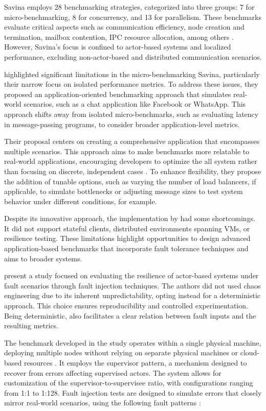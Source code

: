 Savina employs 28 benchmarking strategies, categorized into three groups: 7 for micro-benchmarking, 8 for concurrency, and 13 for parallelism. These benchmarks evaluate critical aspects such as communication efficiency, node creation and termination, mailbox contention, \gls{IPC} resource allocation, among others \cite{Imam2014,Blessing2019}. However, Savina’s focus is confined to actor-based systems and localized performance, excluding non-actor-based and distributed communication scenarios.

\textcite{Blessing2019} highlighted significant limitations in the micro-benchmarking Savina, particularly their narrow focus on isolated performance metrics. To address these issues, they proposed an application-oriented benchmarking approach that simulates real-world scenarios, such as a chat application like Facebook or WhatsApp. This approach shifts away from isolated micro-benchmarks, such as evaluating latency in message-passing programs, to consider broader application-level metrics.

Their proposal centers on creating a comprehensive application that encompasses multiple scenarios. This approach aims to make benchmarks more relatable to real-world applications, encouraging developers to optimize the all system rather than focusing on discrete, independent cases \cite{Blessing2019}. To enhance flexibility, they propose the addition of tunable options, such as varying the number of load balancers, if applicable, to simulate bottlenecks or adjusting message sizes to test system behavior under different conditions, for example.

Despite its innovative approach, the implementation by \textcite{Blessing2019} had some shortcomings. It did not support stateful clients, distributed environments spanning \glspl{VM}, or resilience testing. These limitations highlight opportunities to design advanced application-based benchmarks that incorporate fault tolerance techniques and aims to broader systems.

\textcite{Randtoul2022} present a study focused on evaluating the resilience of actor-based systems under fault scenarios through fault injection techniques. The authors did not used chaos engineering due to its inherent unpredictability, opting instead for a deterministic approach. This choice ensures reproducibility and controlled experimentation. Being deterministic, also facilitates a clear relation between fault inputs and the resulting metrics.

The benchmark developed in the study operates within a single physical machine, deploying multiple nodes without relying on separate physical machines or cloud-based resources \cite{Randtoul2022}. It employs the supervisor pattern, a mechanism designed to recover from errors affecting supervised actors. The system allows for customization of the supervisor-to-supervisee ratio, with configurations ranging from 1:1 to 1:128. Fault injection tests are designed to simulate errors that closely mirror real-world scenarios, using the following fault patterns \cite{Randtoul2022}:

